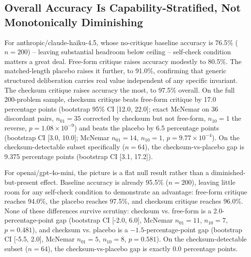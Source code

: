\documentclass[11pt,letterpaper]{article}
\begin{document}
\subsection{Overall Accuracy Is Capability-Stratified, Not Monotonically Diminishing}

For anthropic/claude-haiku-4.5, whose no-critique baseline accuracy is 76.5\% ($n=200$) -- leaving substantial headroom below ceiling -- self-check condition matters a great deal. Free-form critique raises accuracy modestly to 80.5\%. The matched-length placebo raises it further, to 91.0\%, confirming that generic structured deliberation carries real value independent of any specific invariant. The checksum critique raises accuracy the most, to 97.5\% overall. On the full 200-problem sample, checksum critique beats free-form critique by 17.0 percentage points (bootstrap 95\% CI [12.0, 22.0]; exact McNemar on 36 discordant pairs, $n_{01}=35$ corrected by checksum but not free-form, $n_{10}=1$ the reverse, $p=1.08\times10^{-9}$) and beats the placebo by 6.5 percentage points (bootstrap CI [3.0, 10.0]; McNemar $n_{01}=14$, $n_{10}=1$, $p=9.77\times10^{-4}$). On the checksum-detectable subset specifically ($n=64$), the checksum-vs-placebo gap is 9.375 percentage points (bootstrap CI [3.1, 17.2]).

For openai/gpt-4o-mini, the picture is a flat null result rather than a diminished-but-present effect. Baseline accuracy is already 95.5\% ($n=200$), leaving little room for any self-check condition to demonstrate an advantage: free-form critique reaches 94.0\%, the placebo reaches 97.5\%, and checksum critique reaches 96.0\%. None of these differences survive scrutiny: checksum vs. free-form is a 2.0-percentage-point gap (bootstrap CI [-2.0, 6.0], McNemar $n_{01}=11$, $n_{10}=7$, $p=0.481$), and checksum vs. placebo is a $-1.5$-percentage-point gap (bootstrap CI [-5.5, 2.0], McNemar $n_{01}=5$, $n_{10}=8$, $p=0.581$). On the checksum-detectable subset ($n=64$), the checksum-vs-placebo gap is exactly 0.0 percentage points.
\end{document}
